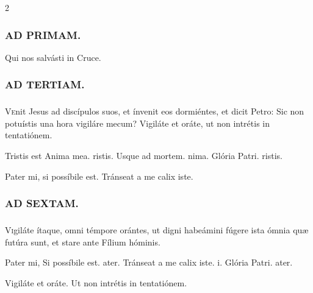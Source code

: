 \documentclass[9pt,twoside]{extarticle}
\begin{document}
\begin{multicols}{2}
\begin{tightlist}{}
\item {}
\end{tightlist}

\subsubsection*{\center \textsc{AD PRIMAM.}}
\begin{tightlist}{}
\item {} Qui nos salvásti in Cruce.
\end{tightlist}

\subsubsection*{\center \textsc{AD TERTIAM.}}
\subsubsection*{}
\lettrine{V}enit Jesus ad discípulos suos, et ínvenit eos dormiéntes, et dicit Petro: Sic non potuístis una hora vigiláre mecum? Vigiláte et oráte, ut non intrétis in tentatiónem.

\begin{tightlist}{}
\item {} Tristis est \textred{*} Anima mea. ristis.  Usque ad mortem. nima. Glória Patri. ristis.
\item {} Pater mi, si possíbile est.  Tránseat a me calix iste.
\end{tightlist}
\subsubsection*{\center \textsc{AD SEXTAM.}}
\subsubsection*{}
\lettrine{V}igiláte ítaque, omni témpore orántes, ut digni habeámini fúgere ista ómnia quæ futúra sunt, et stare ante Fílium hóminis.

\begin{tightlist}{}
\item {} Pater mi, \textred{*} Si possíbile est. ater.  Tránseat a me calix iste. i. Glória Patri. ater.
\item {} Vigiláte et oráte.  Ut non intrétis in tentatiónem.
\end{tightlist}


\end{multicols}
\end{document}
